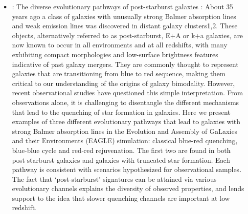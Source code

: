 \documentclass[ceqn,usenatbib,onecolumn]{mnras}
\begin{document}
\begin{itemize}
    \item \citet{2019NatAs...3..440P} : The diverse evolutionary pathways of post-starburst galaxies : About 35 years ago a class of galaxies with unusually strong Balmer absorption lines and weak emission lines was discovered in distant galaxy clusters1,2. These objects, alternatively referred to as post-starburst, E+A or k+a galaxies, are now known to occur in all environments and at all redshifts, with many exhibiting compact morphologies and low-surface brightness features indicative of past galaxy mergers. They are commonly thought to represent galaxies that are transitioning from blue to red sequence, making them critical to our understanding of the origins of galaxy bimodality. However, recent observational studies have questioned this simple interpretation. From observations alone, it is challenging to disentangle the different mechanisms that lead to the quenching of star formation in galaxies. Here we present examples of three different evolutionary pathways that lead to galaxies with strong Balmer absorption lines in the Evolution and Assembly of GaLaxies and their Environments (EAGLE) simulation: classical blue-red quenching, blue-blue cycle and red-red rejuvenation. The first two are found in both post-starburst galaxies and galaxies with truncated star formation. Each pathway is consistent with scenarios hypothesized for observational samples. The fact that ‘post-starburst’ signatures can be attained via various evolutionary channels explains the diversity of observed properties, and lends support to the idea that slower quenching channels are important at low redshift.

\end{itemize}
\end{document}
